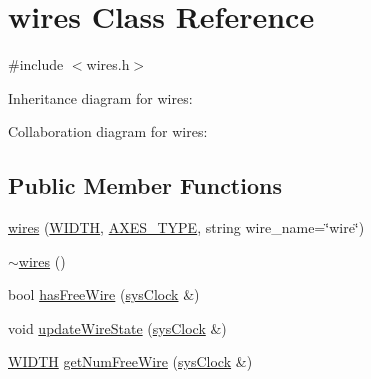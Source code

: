 \hypertarget{classwires}{
\section{wires Class Reference}
\label{classwires}
}


{\ttfamily \#include $<$wires.h$>$}



Inheritance diagram for wires:


Collaboration diagram for wires:
\subsection*{Public Member Functions}
\begin{DoxyCompactItemize}
\item 
\hyperlink{classwires_a83cbfcb51f8312d7f7ba6de2aaf4bd2d}{wires} (\hyperlink{global_2global_8h_a6fa2e24b8a418fa215e183264cbea3aa}{WIDTH}, \hyperlink{binaryTranslator_2global_8h_a94b8423a23b95a7adac22848b81e7c0c}{AXES\_\-TYPE}, string wire\_\-name=\char`\"{}wire\char`\"{})
\item 
\hyperlink{classwires_a9ab869c88f82f1b3176c3c24bcf003f8}{$\sim$wires} ()
\item 
bool \hyperlink{classwires_a771fb9276284f0780918b49484a66abf}{hasFreeWire} (\hyperlink{classsysClock}{sysClock} \&)
\item 
void \hyperlink{classwires_ace9558373a8974248bf4d126574f0758}{updateWireState} (\hyperlink{classsysClock}{sysClock} \&)
\item 
\hyperlink{global_2global_8h_a6fa2e24b8a418fa215e183264cbea3aa}{WIDTH} \hyperlink{classwires_a464c90345006d2077ba1023ba77b59f1}{getNumFreeWire} (\hyperlink{classsysClock}{sysClock} \&)
\end{DoxyCompactItemize}


